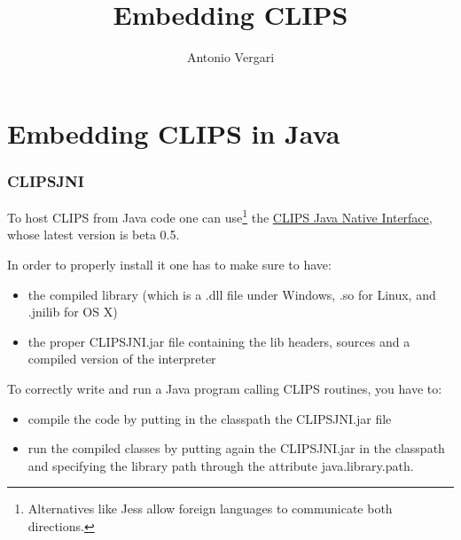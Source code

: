 \documentclass[xcolor={usenames,dvipsnames,svgnames}, compress]{beamer}
\begin{document}
\title{Embedding CLIPS}
\author{Antonio Vergari}

\footnotesize \let\small\footnotesize





{
  \begin{frame}
    \titlepage
  \end{frame}
}






\section{Embedding CLIPS in Java}
{
  \begin{frame}
    \sectionpage
  \end{frame}
}

\begin{frame}
  \frametitle{CLIPSJNI}
  To host CLIPS from Java code one can use\footnote{Alternatives like
    Jess allow foreign languages to communicate both directions.} the
  \href{http://www.clipsrules.net/?q=Downloads/CLIPSJNI}{\textsf{CLIPS
      Java Native Interface}}, whose latest version is beta
  0.5.\par\bigskip

  In order to properly install it one has to make sure to have:
  \begin{itemize}
  \item the compiled library (which is a \textsf{.dll} file under Windows, \textsf{.so}
    for Linux, and \textsf{.jnilib} for OS X)
    \item the proper CLIPSJNI.jar file containing the lib headers,
      sources and a compiled version of the interpreter
  \end{itemize}\bigskip

  To correctly write and run a Java program calling CLIPS routines,
  you have to:
  \begin{itemize}
  \item compile the code by putting in the classpath the CLIPSJNI.jar
    file
    \item run the compiled classes by putting again the CLIPSJNI.jar
      in the classpath and specifying the library path through the
      attribute \textsf{java.library.path}.
  \end{itemize}
\end{frame}
\end{document}
